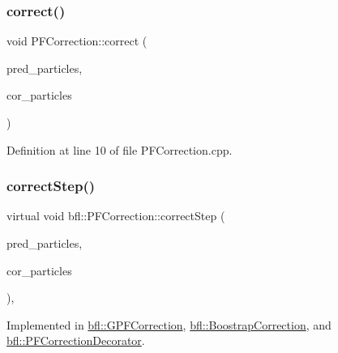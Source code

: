 \subsubsection{\texorpdfstring{correct()}{correct()}}
{\footnotesize\ttfamily void P\+F\+Correction\+::correct (\begin{DoxyParamCaption}\item[{const \mbox{\hyperlink{classbfl_1_1ParticleSet}{bfl\+::\+Particle\+Set}} \&}]{pred\+\_\+particles,  }\item[{\mbox{\hyperlink{classbfl_1_1ParticleSet}{bfl\+::\+Particle\+Set}} \&}]{cor\+\_\+particles }\end{DoxyParamCaption})}



Definition at line 10 of file P\+F\+Correction.\+cpp.

\mbox{\label{classbfl_1_1PFCorrection_ae0413156a1258d88485e57a983c89af1}} 
\subsubsection{\texorpdfstring{correct\+Step()}{correctStep()}}
{\footnotesize\ttfamily virtual void bfl\+::\+P\+F\+Correction\+::correct\+Step (\begin{DoxyParamCaption}\item[{const \mbox{\hyperlink{classbfl_1_1ParticleSet}{bfl\+::\+Particle\+Set}} \&}]{pred\+\_\+particles,  }\item[{\mbox{\hyperlink{classbfl_1_1ParticleSet}{bfl\+::\+Particle\+Set}} \&}]{cor\+\_\+particles }\end{DoxyParamCaption})\hspace{0.3cm}{\ttfamily [protected]}, {}}



Implemented in \mbox{\hyperlink{classbfl_1_1GPFCorrection_a291a05d78f7f2ee835140bfe4995a2bb}{bfl\+::\+G\+P\+F\+Correction}}, \mbox{\hyperlink{classbfl_1_1BoostrapCorrection_a493eed345120c5babb0f3591d9c7c854}{bfl\+::\+Boostrap\+Correction}}, and \mbox{\hyperlink{classbfl_1_1PFCorrectionDecorator_a83bb9ac8ba168f99f211973ae634391a}{bfl\+::\+P\+F\+Correction\+Decorator}}.

\mbox{\label{classbfl_1_1PFCorrection_ab6eca766077c4ab1db3417dab6c44d27}} 
